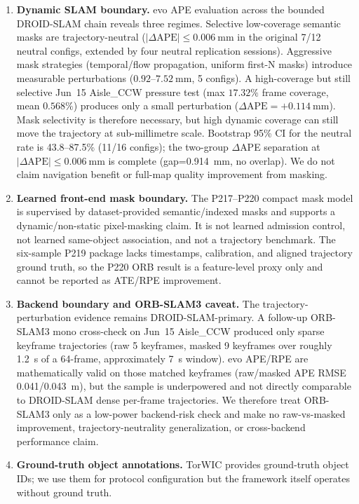 \documentclass[journal]{IEEEtran}
\begin{document}
\begin{enumerate}
  \item \textbf{Dynamic SLAM boundary.} evo APE evaluation across the bounded DROID-SLAM chain reveals three regimes. Selective low-coverage semantic masks are trajectory-neutral ($|\Delta\text{APE}| \leq 0.006~\text{mm}$ in the original 7/12 neutral configs, extended by four neutral replication sessions). Aggressive mask strategies (temporal/flow propagation, uniform first-N masks) introduce measurable perturbations ($0.92$--$7.52~\text{mm}$, 5 configs). A high-coverage but still selective Jun~15 Aisle\_CCW pressure test (max $17.32\%$ frame coverage, mean $0.568\%$) produces only a small perturbation ($\Delta\text{APE}=+0.114~\text{mm}$). Mask selectivity is therefore necessary, but high dynamic coverage can still move the trajectory at sub-millimetre scale. Bootstrap 95\% CI for the neutral rate is 43.8--87.5\% (11/16 configs); the two-group $\Delta$APE separation at $|\Delta\text{APE}| \leq 0.006~\text{mm}$ is complete (gap=0.914~mm, no overlap). We do not claim navigation benefit or full-map quality improvement from masking.
  \item \textbf{Learned front-end mask boundary.} The P217--P220 compact mask model is supervised by dataset-provided semantic/indexed masks and supports a dynamic/non-static pixel-masking claim. It is not learned admission control, not learned same-object association, and not a trajectory benchmark. The six-sample P219 package lacks timestamps, calibration, and aligned trajectory ground truth, so the P220 ORB result is a feature-level proxy only and cannot be reported as ATE/RPE improvement.
  \item \textbf{Backend boundary and ORB-SLAM3 caveat.} The trajectory-perturbation evidence remains DROID-SLAM-primary. A follow-up ORB-SLAM3 mono cross-check on Jun~15 Aisle\_CCW produced only sparse keyframe trajectories (raw 5 keyframes, masked 9 keyframes over roughly 1.2~s of a 64-frame, approximately 7~s window). evo APE/RPE are mathematically valid on those matched keyframes (raw/masked APE RMSE 0.041/0.043~m), but the sample is underpowered and not directly comparable to DROID-SLAM dense per-frame trajectories. We therefore treat ORB-SLAM3 only as a low-power backend-risk check and make no raw-vs-masked improvement, trajectory-neutrality generalization, or cross-backend performance claim.
  \item \textbf{Ground-truth object annotations.} TorWIC provides ground-truth object IDs; we use them for protocol configuration but the framework itself operates without ground truth.
\end{enumerate}
\end{document}
